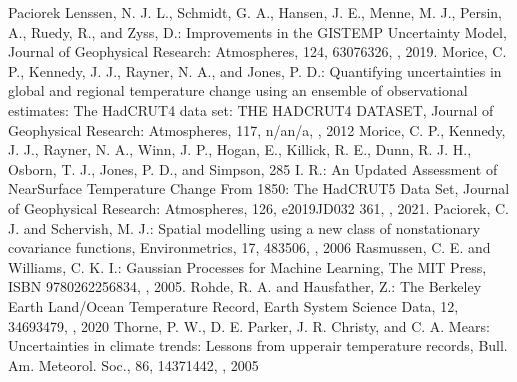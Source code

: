 \documentclass[letterpaper,10pt,english]{sphinxmanual}
\begin{document}
\begin{sphinxthebibliography}{Paciorek}
\sphinxAtStartPar
Lenssen, N. J. L., Schmidt, G. A., Hansen, J. E., Menne, M. J., Persin, A., Ruedy, R., and Zyss, D.: Improvements in the GISTEMP Uncertainty Model, Journal of Geophysical Research: Atmospheres, 124, 6307\textendash{}6326, , 2019.
\sphinxAtStartPar
Morice, C. P., Kennedy, J. J., Rayner, N. A., and Jones, P. D.: Quantifying uncertainties in global and regional temperature change using an ensemble of observational estimates: The HadCRUT4 data set: THE HADCRUT4 DATASET, Journal of Geophysical Research: Atmospheres, 117, n/a\textendash{}n/a, , 2012
\sphinxAtStartPar
Morice, C. P., Kennedy, J. J., Rayner, N. A., Winn, J. P., Hogan, E., Killick, R. E., Dunn, R. J. H., Osborn, T. J., Jones, P. D., and Simpson, 285 I. R.: An Updated Assessment of Near\sphinxhyphen{}Surface Temperature Change From 1850: The HadCRUT5 Data Set, Journal of Geophysical Research: Atmospheres, 126, e2019JD032 361, , 2021.
\sphinxAtStartPar
Paciorek, C. J. and Schervish, M. J.: Spatial modelling using a new class of nonstationary covariance functions, Environmetrics, 17, 483\textendash{}506, , 2006
\sphinxAtStartPar
Rasmussen, C. E. and Williams, C. K. I.: Gaussian Processes for Machine Learning, The MIT Press, ISBN 978\sphinxhyphen{}0\sphinxhyphen{}262\sphinxhyphen{}25683\sphinxhyphen{}4, , 2005.
\sphinxAtStartPar
Rohde, R. A. and Hausfather, Z.: The Berkeley Earth Land/Ocean Temperature Record, Earth System Science Data, 12, 3469\textendash{}3479, , 2020
\sphinxAtStartPar
Thorne, P. W., D. E. Parker, J. R. Christy, and C. A. Mears: Uncertainties in climate trends: Lessons from upper\sphinxhyphen{}air temperature records, Bull. Am. Meteorol. Soc., 86, 1437\textendash{}1442, , 2005
\end{sphinxthebibliography}
\end{document}
